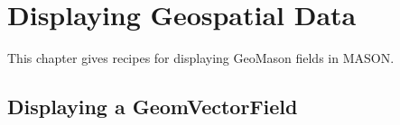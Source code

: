 \documentclass[twoside,10pt]{book}
\newcommand\code[1]{\textsf{#1}}
\begin{document}

\chapter{Displaying Geospatial Data}
\label{ch:displaying}

This chapter gives recipes for displaying GeoMason fields in MASON.



\section{Displaying a \code{GeomVectorField}}
\label{sec:displayingGeomVectorField}
\end{document}

